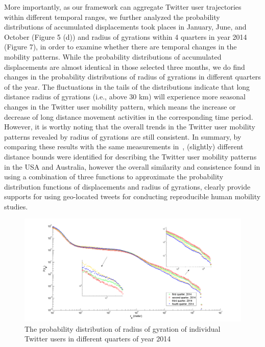 \documentclass[a4paper, 11pt]{article}
\begin{document}
More importantly, as our framework can aggregate Twitter user trajectories within different temporal ranges, we further analyzed the probability distributions of accumulated displacements took places in January, June, and October (Figure 5 (d)) and radius of gyrations within 4 quarters in year 2014 (Figure 7), in order to examine whether there are temporal changes in the mobility patterns. While the probability distributions of accumulated displacements are almost identical in those selected three months,  we do find changes in the probability distributions of radius of gyrations in different quarters of the year. 
The fluctuations in the tails of the distributions indicate that long distance radius of gyrations (i.e., above 30 km) will experience more seasonal changes in the Twitter user mobility pattern, which means the increase or decrease of long distance movement activities in the corresponding time period. 
However, it is worthy noting that the overall trends in the Twitter user mobility patterns revealed by radius of gyrations are still consistent.  In summary, by comparing these results with the same measurements in~\citep{Jurdak2015}, (slightly) different distance bounds were identified for describing the Twitter user mobility patterns in the USA and Australia, however the overall similarity and consistence found in using a combination of three functions to approximate the probability distribution functions of displacements and radius of gyrations, clearly provide supports for using geo-located tweets for conducting reproducible human mobility studies.       
 
\begin{figure}[h]
\centering
\includegraphics[width=1.0\linewidth]{./figures/gyration_season}
\caption{The probability distribution of radius of gyration of individual Twitter users in different quarters of year 2014}
\label{fig:Arch}
\end{figure}
\FloatBarrier
\end{document}
